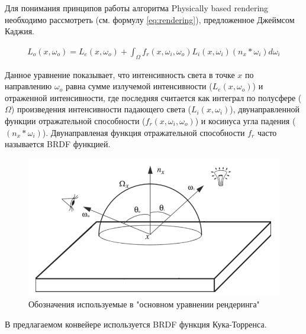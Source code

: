 			Для понимания принципов работы алгоритма Physically based rendering необходимо рассмотреть  (см. формулу \ref{eq:rendering}), предложенное Джеймсом Каджия\cite{kajiya1986rendering}. 
			
			\begin{equation}
				\label{eq:rendering}
				\begin{multlined}
					L_o(x, \omega_o) = L_e(x, \omega_o) + \int_{\Omega} f_r(x, \omega_i, \omega_o)L_i(x, \omega_i)(n_x * \omega_i)d\omega_i
				\end{multlined}
			\end{equation}
			
			Данное уравнение показывает, что интенсивность света в точке $x$ по направлению $\omega_o$ равна сумме излучемой интенсивности ($L_e(x, \omega_o)$) и отраженной интенсивности, где последняя считается как интеграл по полусфере ($\Omega$) произведения интенсивности падающего света ($L_i(x, \omega_i)$), двунаправленной функции отражательной способности ($f_r(x, \omega_i, \omega_o)$) и косинуса угла падения ($(n_x * \omega_i)$). Двунаправленая функция отражательной способности $f_r$ часто называется BRDF функцией. 
			
			\begin{figure}[ht!] 
				\center
				\includegraphics [scale=0.6] {my_folder/images//rendering_eq}	
				\caption{Обозначения используемые в "основном уравнении рендеринга"} 
				\label{fig:base_rendering}
			\end{figure}
			
			В предлагаемом конвейере используется BRDF функция Кука-Торренса\cite{cook1982reflectance}.
